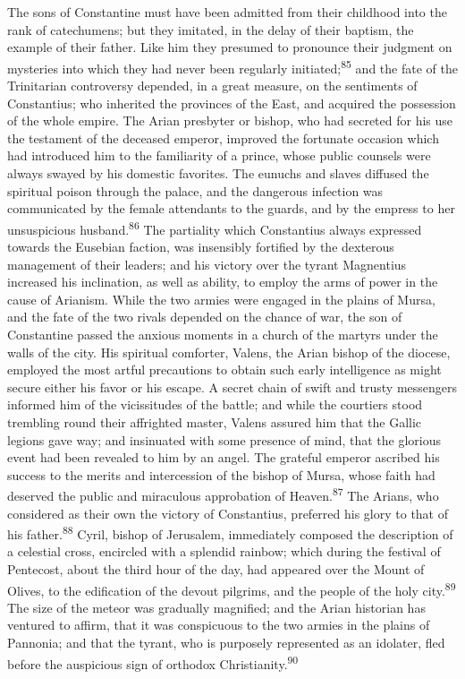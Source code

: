 The sons of Constantine must have been admitted from their
childhood into the rank of catechumens; but they imitated, in the
delay of their baptism, the example of their father. Like him
they presumed to pronounce their judgment on mysteries into which
they had never been regularly initiated;\textsuperscript{85} and the fate of the
Trinitarian controversy depended, in a great measure, on the
sentiments of Constantius; who inherited the provinces of the
East, and acquired the possession of the whole empire. The Arian
presbyter or bishop, who had secreted for his use the testament
of the deceased emperor, improved the fortunate occasion which
had introduced him to the familiarity of a prince, whose public
counsels were always swayed by his domestic favorites. The
eunuchs and slaves diffused the spiritual poison through the
palace, and the dangerous infection was communicated by the
female attendants to the guards, and by the empress to her
unsuspicious husband.\textsuperscript{86} The partiality which Constantius always
expressed towards the Eusebian faction, was insensibly fortified
by the dexterous management of their leaders; and his victory
over the tyrant Magnentius increased his inclination, as well as
ability, to employ the arms of power in the cause of Arianism.
While the two armies were engaged in the plains of Mursa, and the
fate of the two rivals depended on the chance of war, the son of
Constantine passed the anxious moments in a church of the martyrs
under the walls of the city. His spiritual comforter, Valens, the
Arian bishop of the diocese, employed the most artful precautions
to obtain such early intelligence as might secure either his
favor or his escape. A secret chain of swift and trusty
messengers informed him of the vicissitudes of the battle; and
while the courtiers stood trembling round their affrighted
master, Valens assured him that the Gallic legions gave way; and
insinuated with some presence of mind, that the glorious event
had been revealed to him by an angel. The grateful emperor
ascribed his success to the merits and intercession of the bishop
of Mursa, whose faith had deserved the public and miraculous
approbation of Heaven.\textsuperscript{87} The Arians, who considered as their own
the victory of Constantius, preferred his glory to that of his
father.\textsuperscript{88} Cyril, bishop of Jerusalem, immediately composed the
description of a celestial cross, encircled with a splendid
rainbow; which during the festival of Pentecost, about the third
hour of the day, had appeared over the Mount of Olives, to the
edification of the devout pilgrims, and the people of the holy
city.\textsuperscript{89} The size of the meteor was gradually magnified; and the
Arian historian has ventured to affirm, that it was conspicuous
to the two armies in the plains of Pannonia; and that the tyrant,
who is purposely represented as an idolater, fled before the
auspicious sign of orthodox Christianity.\textsuperscript{90}

